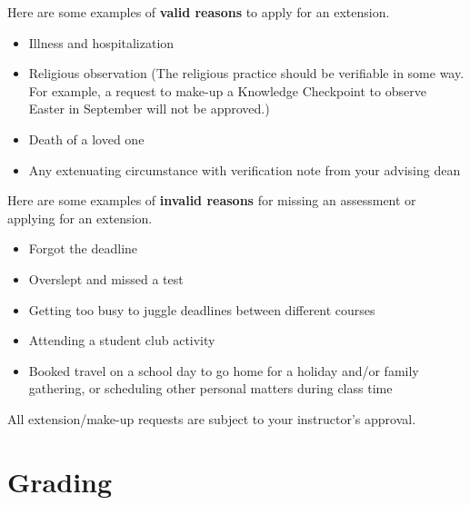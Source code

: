 \documentclass[12pt]{article}
\begin{document}
        Here are some examples of \textbf{valid reasons} to apply for an extension. 
        \begin{itemize}
            \item Illness and hospitalization
            \item Religious observation (The religious practice should be verifiable in some way. For example, a request to make-up a Knowledge Checkpoint to observe Easter in September will not be approved.)
            \item Death of a loved one
            \item Any extenuating circumstance with verification note from your advising dean
        \end{itemize}

        Here are some examples of \textbf{invalid reasons} for missing an assessment or applying for an extension.
        \begin{itemize}
            \item Forgot the deadline
            \item Overslept and missed a test
            \item Getting too busy to juggle deadlines between different courses
            \item Attending a student club activity
            \item Booked travel on a school day to go home for a holiday and/or family gathering, or scheduling other personal matters during class time
        \end{itemize}
        
        All extension/make-up requests are subject to your instructor's approval.
		
	\section{Grading}\label{sec:eval}
\end{document}
